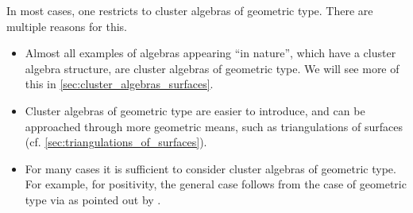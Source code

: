 \medskip

In most cases, one restricts to cluster algebras of geometric type. There are multiple
reasons for this.
\begin{itemize}
	\item Almost all examples of algebras appearing ``in nature'', which have a cluster algebra
	      structure, are cluster algebras of geometric type. We will see more of this in
	      \cref{sec:cluster_algebras_surfaces}.
	\item Cluster algebras of geometric type are easier to introduce, and can be approached
	      through more geometric means, such as triangulations of surfaces (cf.
	      \cref{sec:triangulations_of_surfaces}).
	\item For many cases it is sufficient to consider cluster algebras of geometric type. For
	      example, for positivity, the general case follows from the case of geometric type via
	      \cite[Theorem 3.7]{FominZelevinsky2007CA4Coefficients} as pointed out by
	      \textcite[Theorem 4.2]{LeeSchiffler2015PositivityCA}.
\end{itemize}

